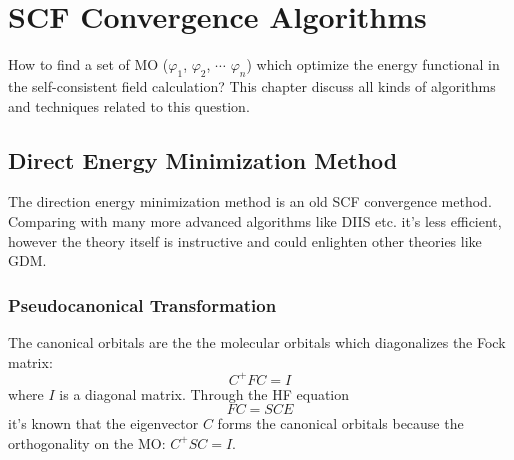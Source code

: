 %
%
\chapter{SCF Convergence Algorithms}

How to find a set of MO ($\varphi_{1}$, $\varphi_{2}$, $\cdots$ $\varphi_{n}$) which optimize
the energy functional in the self-consistent field calculation? This chapter discuss all kinds
of algorithms and techniques related to this question.

\section{Direct Energy Minimization Method}
%
%
%
The direction energy minimization method\cite{DM_SCF} is an old SCF convergence method. Comparing
with many more advanced algorithms like DIIS etc. it's less efficient, however the theory itself
is instructive and could enlighten other theories like GDM\cite{gdm}.

\subsection{Pseudocanonical Transformation}
\label{pseudocanonical_dm_scf}
%
%
%
The canonical orbitals are the the molecular orbitals which diagonalizes the Fock matrix:
\begin{equation}\label{DM_SCF_eq:1}
 C^{+}FC = I
\end{equation}
where $I$ is a diagonal matrix.
Through the HF equation
\begin{equation}\label{DM_SCF_eq:2}
 FC = SCE
\end{equation}
it's known that the eigenvector $C$ forms the canonical orbitals because the orthogonality
on the MO: $C^{+}SC = I$.

